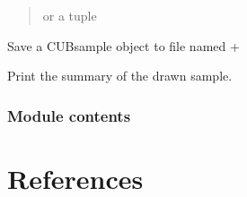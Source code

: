 \documentclass[letterpaper,10pt,english]{sphinxmanual}
\begin{document}
\begin{fulllineitems}
\begin{fulllineitems}
\begin{quote}
\begin{description}
\sphinxAtStartPar
{} or a tuple 

\end{description}\end{quote}

\end{fulllineitems}


\begin{fulllineitems}
\label{\detokenize{cubmods:cubmods.smry.CUBsample.save}}
\pysigstartsignatures
{}
\pysigstopsignatures
\sphinxAtStartPar
Save a CUBsample object to file
named  + 

\end{fulllineitems}


\begin{fulllineitems}
\label{\detokenize{cubmods:cubmods.smry.CUBsample.summary}}
\pysigstartsignatures
{}
\pysigstopsignatures
\sphinxAtStartPar
Print the summary of the drawn sample.

\end{fulllineitems}


\end{fulllineitems}



\subsection{Module contents}
\label{\detokenize{cubmods:module-cubmods}}\label{\detokenize{cubmods:module-contents}}
\sphinxstepscope


\chapter{References}
\label{\detokenize{references:references}}\label{\detokenize{references::doc}}
\end{document}
